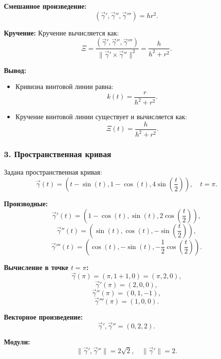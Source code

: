 \documentclass{article}
\begin{document}
        \textbf{Смешанное произведение:}
        \[
        (\vec{\gamma}', \vec{\gamma}'', \vec{\gamma}''') = hr^2.
        \]
        
        \textbf{Кручение:}
        Кручение вычисляется как:
        \[
        \Xi = \frac{(\vec{\gamma}', \vec{\gamma}'', \vec{\gamma}''')}{\|\vec{\gamma}' \times \vec{\gamma}''\|^2} = \frac{h}{h^2 + r^2}.
        \]
        
        \textbf{Вывод:}
        \begin{itemize}
            \item Кривизна винтовой линии равна:
            \[
            k(t) = \frac{r}{h^2 + r^2}.
            \]
            \item Кручение винтовой линии существует и вычисляется как:
            \[
            \Xi(t) = \frac{h}{h^2 + r^2}.
            \]
        \end{itemize}
    \subsubsection*{3. Пространственная кривая}
        
        Задана пространственная кривая:
        \[
        \vec{\gamma}(t) = \left(t - \sin(t), 1 - \cos(t), 4 \sin\left(\frac{t}{2}\right)\right), \quad t = \pi.
        \]
        
        \textbf{Производные:}
        \[
        \vec{\gamma}'(t) = \left(1 - \cos(t), \sin(t), 2 \cos\left(\frac{t}{2}\right)\right),
        \]
        \[
        \vec{\gamma}''(t) = \left(\sin(t), \cos(t), -\sin\left(\frac{t}{2}\right)\right),
        \]
        \[
        \vec{\gamma}'''(t) = \left(\cos(t), -\sin(t), -\frac{1}{2} \cos\left(\frac{t}{2}\right)\right).
        \]
        
        \textbf{Вычисление в точке $t = \pi$:}
        \[
        \vec{\gamma}(\pi) = \left(\pi, 1 + 1, 0\right) = \left(\pi, 2, 0\right),
        \]
        \[
        \vec{\gamma}'(\pi) = \left(2, 0, 0\right),
        \]
        \[
        \vec{\gamma}''(\pi) = \left(0, 1, -1\right),
        \]
        \[
        \vec{\gamma}'''(\pi) = \left(1, 0, 0\right).
        \]
        
        \textbf{Векторное произведение:}
        \[
        \vec{\gamma}' , \vec{\gamma}'' = \left(0, 2, 2\right).
        \]
        
        \textbf{Модули:}
        \[
        \|\vec{\gamma}' , \vec{\gamma}''\| = 2\sqrt{2}, \quad \|\vec{\gamma}'\| = 2.
        \]
        
\end{document}
